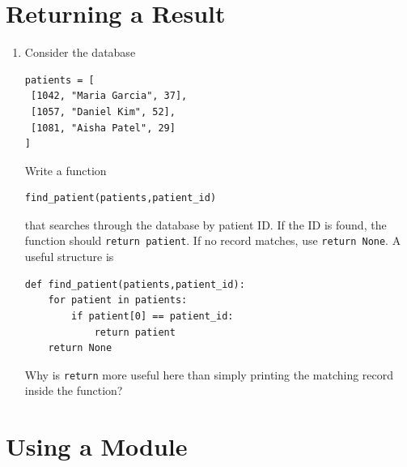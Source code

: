 \documentclass{article}
\begin{document}
\section{Returning a Result}

\begin{enumerate}

\item Consider the database

\begin{verbatim}
patients = [
 [1042, "Maria Garcia", 37],
 [1057, "Daniel Kim", 52],
 [1081, "Aisha Patel", 29]
]
\end{verbatim}

Write a function

\begin{verbatim}
find_patient(patients,patient_id)
\end{verbatim}

that searches through the database by patient ID.  If the ID is found, the function should \verb+return patient+.  If no record matches, use \verb+return None+.  A useful structure is

\begin{verbatim}
def find_patient(patients,patient_id):
    for patient in patients:
        if patient[0] == patient_id:
            return patient
    return None
\end{verbatim}

Why is \texttt{return} more useful here than simply printing the matching record inside the function?

\end{enumerate}


\section{Using a Module}
\end{document}
